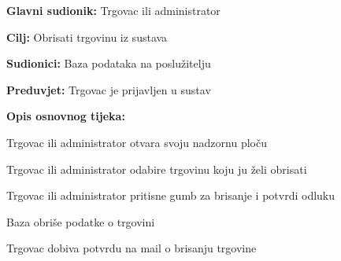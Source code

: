 				
				\noindent {}
				\begin{packed_item}
					\item \textbf{Glavni sudionik:} Trgovac ili administrator
					\item  \textbf{Cilj:} Obrisati trgovinu iz sustava
					\item  \textbf{Sudionici:} Baza podataka na poslužitelju
					\item  \textbf{Preduvjet:} Trgovac je prijavljen u sustav
					\item  \textbf{Opis osnovnog tijeka:}
					\item[] \begin{packed_enum}
						\item Trgovac ili administrator otvara svoju nadzornu ploču
						\item Trgovac ili administrator odabire trgovinu koju ju želi obrisati
						\item Trgovac ili administrator pritisne gumb za brisanje i potvrdi odluku
						\item Baza obriše podatke o trgovini
						\item Trgovac dobiva potvrdu na mail o brisanju trgovine
					\end{packed_enum}
				\end{packed_item}
			
